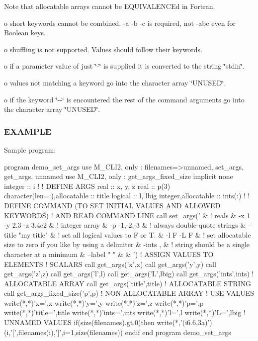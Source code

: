 Note that allocatable arrays cannot be E\+Q\+U\+I\+V\+A\+L\+E\+N\+C\+Ed in Fortran.

o short keywords cannot be combined. -\/a -\/b -\/c is required, not -\/abc even for Boolean keys.

o shuffling is not supported. Values should follow their keywords.

o if a parameter value of just \char`\"{}-\/\char`\"{} is supplied it is converted to the string \char`\"{}stdin\char`\"{}.

o values not matching a keyword go into the character array \char`\"{}\+U\+N\+U\+S\+E\+D\char`\"{}.

o if the keyword \char`\"{}-\/-\/\char`\"{} is encountered the rest of the command arguments go into the character array \char`\"{}\+U\+N\+U\+S\+E\+D\char`\"{}.

\subsubsection*{E\+X\+A\+M\+P\+LE}

Sample program\+: \begin{DoxyVerb}program demo_set_args
use M_CLI2,  only : filenames=>unnamed, set_args, get_args, unnamed
use M_CLI2,  only : get_args_fixed_size
implicit none
integer                      :: i
!
! DEFINE ARGS
real                         :: x, y, z
real                         :: p(3)
character(len=:),allocatable :: title
logical                      :: l, lbig
integer,allocatable          :: ints(:)
!
!  DEFINE COMMAND (TO SET INITIAL VALUES AND ALLOWED KEYWORDS)
!  AND READ COMMAND LINE
call set_args(' &
   ! reals
   & -x 1 -y 2.3 -z 3.4e2 &
   ! integer array
   & -p -1,-2,-3 &
   ! always double-quote strings
   & --title "my title" &
   ! set all logical values to F or T.
   & -l F -L F &
   ! set allocatable size to zero if you like by using a delimiter
   & -ints , &
   ! string should be a single character at a minimum
   & --label " " &
   & ')
! ASSIGN VALUES TO ELEMENTS
!     SCALARS
call get_args('x',x)
call get_args('y',y)
call get_args('z',z)
call get_args('l',l)
call get_args('L',lbig)
call get_args('ints',ints)      ! ALLOCATABLE ARRAY
call get_args('title',title)    ! ALLOCATABLE STRING
call get_args_fixed_size('p',p) ! NON-ALLOCATABLE ARRAY
! USE VALUES
write(*,*)'x=',x
write(*,*)'y=',y
write(*,*)'z=',z
write(*,*)'p=',p
write(*,*)'title=',title
write(*,*)'ints=',ints
write(*,*)'l=',l
write(*,*)'L=',lbig
! UNNAMED VALUES
if(size(filenames).gt.0)then
   write(*,'(i6.6,3a)')(i,'[',filenames(i),']',i=1,size(filenames))
endif
end program demo_set_args
\end{DoxyVerb}


